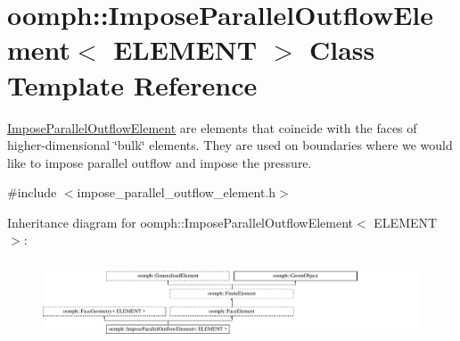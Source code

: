 \hypertarget{classoomph_1_1ImposeParallelOutflowElement}{}\section{oomph\+:\+:Impose\+Parallel\+Outflow\+Element$<$ E\+L\+E\+M\+E\+NT $>$ Class Template Reference}
\label{classoomph_1_1ImposeParallelOutflowElement}


\hyperlink{classoomph_1_1ImposeParallelOutflowElement}{Impose\+Parallel\+Outflow\+Element} are elements that coincide with the faces of higher-\/dimensional \char`\"{}bulk\char`\"{} elements. They are used on boundaries where we would like to impose parallel outflow and impose the pressure.  




{\ttfamily \#include $<$impose\+\_\+parallel\+\_\+outflow\+\_\+element.\+h$>$}

Inheritance diagram for oomph\+:\+:Impose\+Parallel\+Outflow\+Element$<$ E\+L\+E\+M\+E\+NT $>$\+:\begin{figure}[H]
\begin{center}
\leavevmode
\includegraphics[height=2.377919cm]{classoomph_1_1ImposeParallelOutflowElement}
\end{center}
\end{figure}
